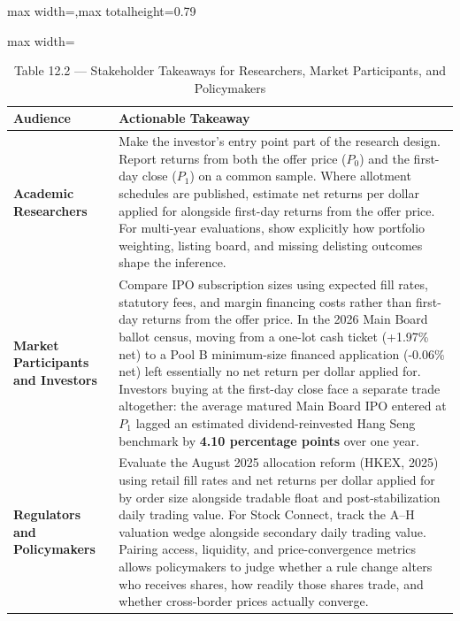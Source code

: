 \documentclass[11pt,letterpaper]{article}
\begin{document}
\begin{table}[!htbp]
\centering
\caption*{Table 12.2 — Stakeholder Takeaways for Researchers, Market Participants, and Policymakers}
\begin{adjustbox}{max width=\textwidth,max totalheight=0.79\textheight}
\begin{minipage}{\textwidth}\centering
\footnotesize
\setlength{\tabcolsep}{3.5pt}
\renewcommand{\arraystretch}{1.18}
\begin{adjustbox}{max width=\textwidth}
\begin{tabular}{>{\raggedright\arraybackslash}p{3.80cm}>{\raggedright\arraybackslash}p{5.80cm}}
\toprule
Audience & Actionable Takeaway \\
\midrule
\textbf{Academic Researchers} & Make the investor's entry point part of the research design. Report returns from both the offer price ($P_0$) and the first-day close ($P_1$) on a common sample. Where allotment schedules are published, estimate net returns per dollar applied for alongside first-day returns from the offer price. For multi-year evaluations, show explicitly how portfolio weighting, listing board, and missing delisting outcomes shape the inference. \\
\textbf{Market Participants and Investors} & Compare IPO subscription sizes using expected fill rates, statutory fees, and margin financing costs rather than first-day returns from the offer price. In the 2026 Main Board ballot census, moving from a one-lot cash ticket (+1.97\% net) to a Pool B minimum-size financed application (-0.06\% net) left essentially no net return per dollar applied for. Investors buying at the first-day close face a separate trade altogether: the average matured Main Board IPO entered at $P_1$ lagged an estimated dividend-reinvested Hang Seng benchmark by \textbf{4.10 percentage points} over one year. \\
\textbf{Regulators and Policymakers} & Evaluate the August 2025 allocation reform (HKEX, 2025) using retail fill rates and net returns per dollar applied for by order size alongside tradable float and post-stabilization daily trading value. For Stock Connect, track the A–H valuation wedge alongside secondary daily trading value. Pairing access, liquidity, and price-convergence metrics allows policymakers to judge whether a rule change alters who receives shares, how readily those shares trade, and whether cross-border prices actually converge. \\
\bottomrule
\end{tabular}
\end{adjustbox}

\end{minipage}
\end{adjustbox}
\end{table}
\end{document}
